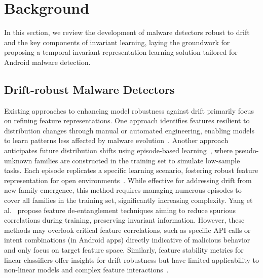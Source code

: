 \section{Background}
In this section, we review the development of malware detectors robust to drift and the key components of invariant learning, laying the groundwork for proposing a temporal invariant representation learning solution tailored for Android malware detection.

\subsection{Drift-robust Malware Detectors}
Existing approaches to enhancing model robustness against drift primarily focus on refining feature representations. One approach identifies features resilient to distribution changes through manual or automated engineering, enabling models to learn patterns less affected by malware evolution~\cite{apigraph}. Another approach anticipates future distribution shifts using episode-based learning~\cite{episode_learning_1, episode_learning_2}, where pseudo-unknown families are constructed in the training set to simulate low-sample tasks. Each episode replicates a specific learning scenario, fostering robust feature representation for open environments~\cite{DOMR}. While effective for addressing drift from new family emergence, this method requires managing numerous episodes to cover all families in the training set, significantly increasing complexity. Yang et al.~\cite{scrr} propose feature de-entanglement techniques aiming to reduce spurious correlations during training, preserving invariant information. However, these methods may overlook critical feature correlations, such as specific API calls or intent combinations (in Android apps) directly indicative of malicious behavior and only focus on target feature space. Similarly, feature stability metrics for linear classifiers offer insights for drift robustness but have limited applicability to non-linear models and complex feature interactions~\cite{svm_ce}.

